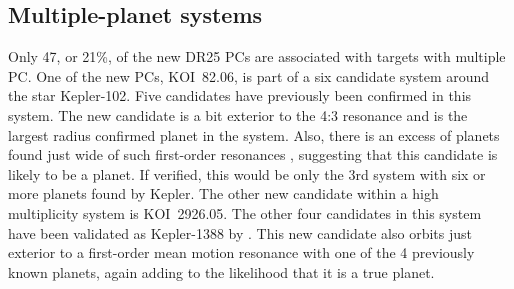 \subsection{Multiple-planet systems}
Only 47, or 21\%, of the new DR25 PCs are associated with targets with multiple PC. One of the new PCs, KOI~82.06, is part of a six candidate system around the star Kepler-102. Five candidates have previously been confirmed \citep{Marcy2014,Rowe2014} in this system. The new candidate is a bit exterior to the 4:3 resonance and is the largest radius confirmed planet in the system. Also, there is an excess of planets found just wide of such first-order resonances \citep{Lissauer2011}, suggesting that this candidate is likely to be a planet. If verified, this would be only the 3rd system with six or more planets found by Kepler. 
The other new candidate within a high multiplicity system is KOI~2926.05. The other four candidates in this system have been validated as Kepler-1388 by \citet{Morton2016}. This new candidate also orbits just exterior to a first-order mean motion resonance with one of the 4 previously known planets, again adding to the likelihood that it is a true planet.

